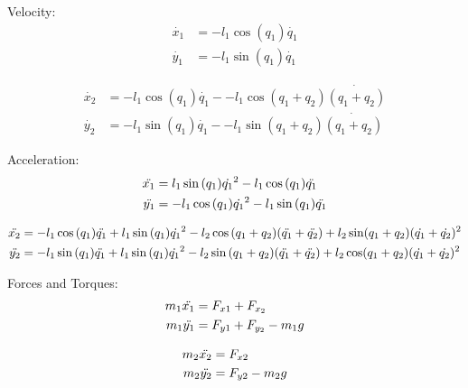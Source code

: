 Velocity:
\begin{equation}
\begin{split}
    \Dot{x_1} &= -l_1\cos(q_1)\Dot{q_1} \\
    \Dot{y_1} &= -l_1\sin(q_1)\Dot{q_1}
\end{split}
\end{equation}

\begin{equation}
\begin{split}
    \Dot{x_2} &= -l_1\cos(q_1)\Dot{q_1} - -l_1\cos(q_1+q_2)\Dot{(q_1+q_2)} \\
    \Dot{y_2} &= -l_1\sin(q_1)\Dot{q_1} - -l_1\sin(q_1+q_2)\Dot{(q_1+q_2)}
\end{split}
\end{equation}

Acceleration:
\begin{equation}
\begin{split}
    \Ddot{x_1} &= l_1 \sin{(q_1)}\Dot{q_1}^2 - l_1 \cos{(q_1)}\Ddot{q_1} \\
    \Ddot{y_1} &= -l_1 \cos{(q_1)}\Dot{q_1}^2 - l_1 \sin{(q_1)}\Ddot{q_1}
\end{split}
\end{equation}

\begin{equation}
\begin{split}
    \Ddot{x_2} &= -l_1\cos{(q_1)}\Ddot{q_1} + l_1\sin{(q_1)}\Dot{q_1}^2 - l_2\cos{(q_1+q_2)}(\Ddot{q_1} + \Ddot{q_2}) + l_2\sin(q_1+q_2)(\Dot{q_1} + \Dot{q_2})^2 \\
    \Ddot{y_2} &= -l_1\sin{(q_1)}\Ddot{q_1} + l_1\sin{(q_1)}\Dot{q_1}^2 - l_2\sin{(q_1+q_2)}(\Ddot{q_1} + \Ddot{q_2}) + l_2\cos(q_1+q_2)(\Dot{q_1} + \Dot{q_2})^2
\end{split}
\end{equation}

Forces and Torques:
\begin{equation}
\begin{split}
    m_1\Ddot{x_1} &= F_{x1} + F_{x_2} \\
    m_1\Ddot{y_1} &= F_{y1} + F_{y_2} - m_1g
\end{split}
\end{equation}

\begin{equation}
\begin{split}
    m_2\Ddot{x_2} &= F_{x2} \\
    m_2\Ddot{y_2} &= F_{y2} - m_2g
\end{split}
\end{equation}

